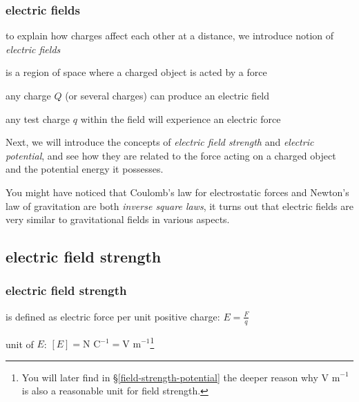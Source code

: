 
\subsubsection{electric fields}

to explain how charges affect each other at a distance, we introduce notion of \emph{electric fields}

\begin{ilight}
	 is a region of space where a charged object is acted by a force
\end{ilight}

any charge $Q$ (or several charges) can produce an electric field

any test charge $q$ within the field will experience an electric force

\vspace*{\baselineskip}

Next, we will introduce the concepts of \emph{electric field strength} and \emph{electric potential}, and see how they are related to the force acting on a charged object and the potential energy it possesses.

You might have noticed that Coulomb's law for electrostatic forces and Newton's law of gravitation are both \emph{inverse square laws}, it turns out that electric fields are very similar to gravitational fields in various aspects.



\subsection{electric field strength}

\subsubsection{electric field strength}

\rcyskip

\begin{ilight}
	 is defined as electric force per unit positive charge: $\boxed{E=\frac{F}{q}}$
\end{ilight}

\cmt unit of $E$: $[E]=\text{N C}^{-1} = \text{V m}^{-1}$\footnote{You will later find in \S\ref{field-strength-potential} the deeper reason why $\text{V m}^{-1}$ is also a reasonable unit for field strength.}

